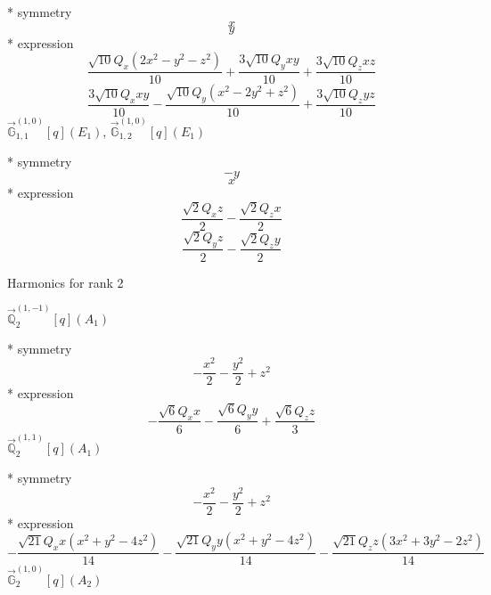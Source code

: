 \documentclass[fleqn,8pt]{jsarticle}
\begin{document}
\noindent\quad ** symmetry
\begin{dmath*}
x
\end{dmath*}
\begin{dmath*}
y
\end{dmath*}
\noindent\quad ** expression
\begin{dmath*}
\frac{\sqrt{10} Q_{x} \left(2 x^{2} - y^{2} - z^{2}\right)}{10} + \frac{3 \sqrt{10} Q_{y} x y}{10} + \frac{3 \sqrt{10} Q_{z} x z}{10}
\end{dmath*}
\begin{dmath*}
\frac{3 \sqrt{10} Q_{x} x y}{10} - \frac{\sqrt{10} Q_{y} \left(x^{2} - 2 y^{2} + z^{2}\right)}{10} + \frac{3 \sqrt{10} Q_{z} y z}{10}
\end{dmath*}
\noindent\quad $\vec{\mathbb{G}}_{1,1}^{(1,0)}[q](E_{1})$, $\vec{\mathbb{G}}_{1,2}^{(1,0)}[q](E_{1})$

\noindent\quad ** symmetry
\begin{dmath*}
- y
\end{dmath*}
\begin{dmath*}
x
\end{dmath*}
\noindent\quad ** expression
\begin{dmath*}
\frac{\sqrt{2} Q_{x} z}{2} - \frac{\sqrt{2} Q_{z} x}{2}
\end{dmath*}
\begin{dmath*}
\frac{\sqrt{2} Q_{y} z}{2} - \frac{\sqrt{2} Q_{z} y}{2}
\end{dmath*}

\noindent * Harmonics for rank 2

\noindent\quad $\vec{\mathbb{Q}}_{2}^{(1,-1)}[q](A_{1})$

\noindent\quad ** symmetry
\begin{dmath*}
- \frac{x^{2}}{2} - \frac{y^{2}}{2} + z^{2}
\end{dmath*}
\noindent\quad ** expression
\begin{dmath*}
- \frac{\sqrt{6} Q_{x} x}{6} - \frac{\sqrt{6} Q_{y} y}{6} + \frac{\sqrt{6} Q_{z} z}{3}
\end{dmath*}
\noindent\quad $\vec{\mathbb{Q}}_{2}^{(1,1)}[q](A_{1})$

\noindent\quad ** symmetry
\begin{dmath*}
- \frac{x^{2}}{2} - \frac{y^{2}}{2} + z^{2}
\end{dmath*}
\noindent\quad ** expression
\begin{dmath*}
- \frac{\sqrt{21} Q_{x} x \left(x^{2} + y^{2} - 4 z^{2}\right)}{14} - \frac{\sqrt{21} Q_{y} y \left(x^{2} + y^{2} - 4 z^{2}\right)}{14} - \frac{\sqrt{21} Q_{z} z \left(3 x^{2} + 3 y^{2} - 2 z^{2}\right)}{14}
\end{dmath*}
\noindent\quad $\vec{\mathbb{G}}_{2}^{(1,0)}[q](A_{2})$
\end{document}
